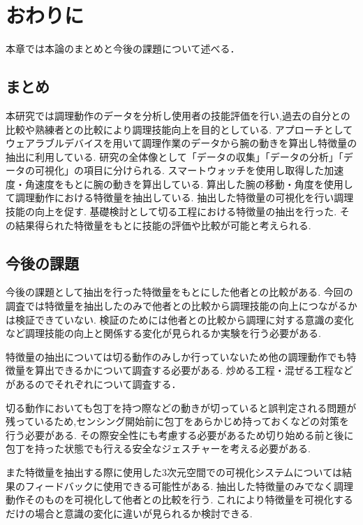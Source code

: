 \section{おわりに}
本章では本論のまとめと今後の課題について述べる．
\subsection{まとめ}
本研究では調理動作のデータを分析し使用者の技能評価を行い,過去の自分との比較や熟練者との比較により調理技能向上を目的としている.
アプローチとしてウェアラブルデバイスを用いて調理作業のデータから腕の動きを算出し特徴量の抽出に利用している.
研究の全体像として「データの収集」「データの分析」「データの可視化」の項目に分けられる.
スマートウォッチを使用し取得した加速度・角速度をもとに腕の動きを算出している.
算出した腕の移動・角度を使用して調理動作における特徴量を抽出している.
抽出した特徴量の可視化を行い調理技能の向上を促す.
基礎検討として切る工程における特徴量の抽出を行った.
その結果得られた特徴量をもとに技能の評価や比較が可能と考えられる.
\subsection{今後の課題}
今後の課題として抽出を行った特徴量をもとにした他者との比較がある.
今回の調査では特徴量を抽出したのみで他者との比較から調理技能の向上につながるかは検証できていない.
検証のためには他者との比較から調理に対する意識の変化など調理技能の向上と関係する変化が見られるか実験を行う必要がある.

特徴量の抽出については切る動作のみしか行っていないため他の調理動作でも特徴量を算出できるかについて調査する必要がある.
炒める工程・混ぜる工程などがあるのでそれぞれについて調査する．


切る動作においても包丁を持つ際などの動きが切っていると誤判定される問題が残っているため,センシング開始前に包丁をあらかじめ持っておくなどの対策を行う必要がある.
その際安全性にも考慮する必要があるため切り始める前と後に包丁を持った状態でも行える安全なジェスチャーを考える必要がある.

また特徴量を抽出する際に使用した3次元空間での可視化システムについては結果のフィードバックに使用できる可能性がある.
抽出した特徴量のみでなく調理動作そのものを可視化して他者との比較を行う.
これにより特徴量を可視化するだけの場合と意識の変化に違いが見られるか検討できる.